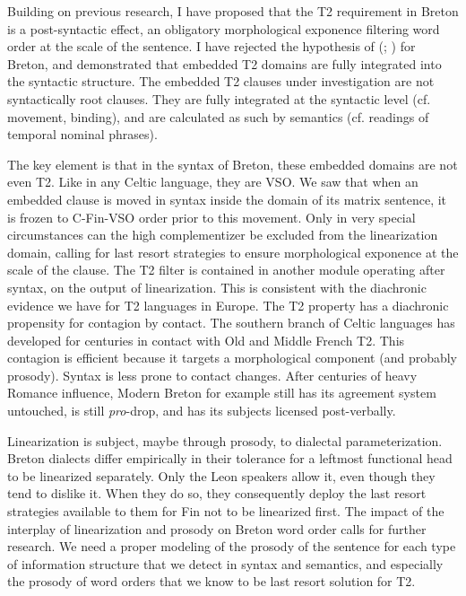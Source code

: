 \documentclass[output=paper,colorlinks,citecolor=brown]{langscibook}
\begin{document}
Building on previous research, I have proposed that the T2 requirement in Breton is a post-syntactic effect, an obligatory morphological exponence filtering word order at the scale of the sentence. I have rejected the hypothesis of \citeauthor{mj:Wurmbrand2012} (\citeyear{mj:Wurmbrand2012}; \citeyear{mj:Wurmbrand2014}) for Breton, and demonstrated that embedded T2 domains are fully integrated into the syntactic structure. The embedded T2 clauses under investigation are not syntactically root clauses. They are fully integrated at the syntactic level (cf. movement, binding), and are calculated as such by semantics (cf. readings of temporal nominal phrases).

The key element is that in the syntax of Breton, these embedded domains are not even T2. Like in any Celtic language, they are VSO. We saw that when an embedded clause is moved in syntax inside the domain of its matrix sentence, it is frozen to C-Fin-VSO order prior to this movement. Only in very special circumstances can the high complementizer be excluded from the linearization domain, calling for last resort strategies to ensure morphological exponence at the scale of the clause. The T2 filter is contained in another module operating after syntax, on the output of linearization. This is consistent with the diachronic evidence we have for T2 languages in Europe. The T2 property has a diachronic propensity for contagion by contact. The southern branch of Celtic languages has developed for centuries in contact with Old and Middle French T2. This contagion is efficient because it targets a morphological component (and probably prosody). Syntax is less prone to contact changes. After centuries of heavy Romance influence, Modern Breton for example still has its agreement system untouched, is still \textit{pro}-drop, and has its subjects licensed post-verbally.

Linearization is subject, maybe through prosody, to dialectal parameterization. Breton dialects differ empirically in their tolerance for a leftmost functional head to be linearized separately. Only the Leon speakers allow it, even though they tend to dislike it. When they do so, they consequently deploy the last resort strategies available to them for Fin not to be linearized first. The impact of the interplay of linearization and prosody on Breton word order calls for further research. We need a proper modeling of the prosody of the sentence for each type of information structure that we detect in syntax and semantics, and especially the prosody of word orders that we know to be last resort solution for T2.
\end{document}
